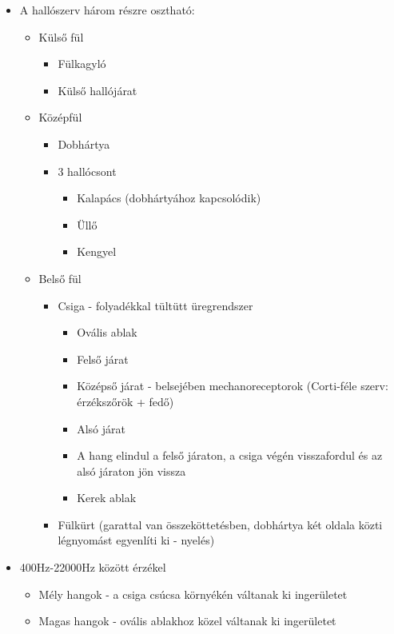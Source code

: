 \documentclass{article}
\begin{document}
\begin{itemize}
    \item A hallószerv három részre osztható: 
    \begin{itemize}
        \item Külső fül \begin{itemize}
            \item Fülkagyló
            \item Külső hallójárat
        \end{itemize}
        \item Középfül \begin{itemize}
            \item Dobhártya 
            \item 3 hallócsont \begin{itemize}
                \item Kalapács (dobhártyához kapcsolódik)
                \item Üllő 
                \item Kengyel
            \end{itemize}
        \end{itemize}
        \item Belső fül \begin{itemize}
            \item Csiga - folyadékkal tültütt üregrendszer \begin{itemize}
                \item Ovális ablak
                \item Felső járat
                \item Középső járat -  belsejében mechanoreceptorok (Corti-féle szerv: érzékszőrök + fedő)
                \item Alsó járat
                \item A hang elindul a felső járaton, a csiga végén visszafordul és az alsó járaton jön vissza
                \item Kerek ablak
            \end{itemize}
            \item Fülkürt (garattal van összeköttetésben, dobhártya két oldala közti légnyomást egyenlíti ki - nyelés)
        \end{itemize}
    \end{itemize}

    \item 400Hz-22000Hz között érzékel \begin{itemize}
        \item Mély hangok - a csiga csúcsa környékén váltanak ki ingerületet
        \item Magas hangok -  ovális ablakhoz közel váltanak ki ingerületet
    \end{itemize}
\end{itemize}
\end{document}
